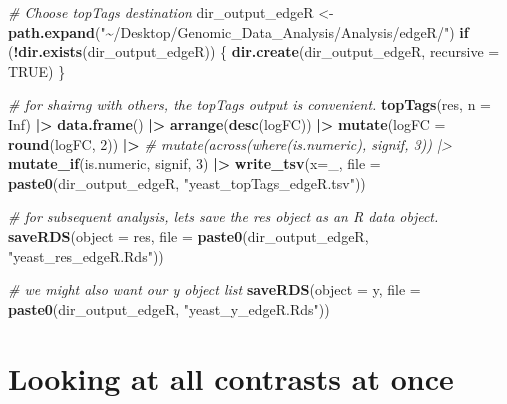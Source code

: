 \documentclass[
]{book}
\newenvironment{Shaded}{\begin{snugshade}}{\end{snugshade}}
\newcommand{\AttributeTok}[1]{\textcolor[rgb]{0.13,0.29,0.53}{#1}}
\newcommand{\CommentTok}[1]{\textcolor[rgb]{0.56,0.35,0.01}{\textit{#1}}}
\newcommand{\ConstantTok}[1]{\textcolor[rgb]{0.56,0.35,0.01}{#1}}
\newcommand{\ControlFlowTok}[1]{\textcolor[rgb]{0.13,0.29,0.53}{\textbf{#1}}}
\newcommand{\DecValTok}[1]{\textcolor[rgb]{0.00,0.00,0.81}{#1}}
\newcommand{\FunctionTok}[1]{\textcolor[rgb]{0.13,0.29,0.53}{\textbf{#1}}}
\newcommand{\NormalTok}[1]{#1}
\newcommand{\OtherTok}[1]{\textcolor[rgb]{0.56,0.35,0.01}{#1}}
\newcommand{\SpecialCharTok}[1]{\textcolor[rgb]{0.81,0.36,0.00}{\textbf{#1}}}
\newcommand{\StringTok}[1]{\textcolor[rgb]{0.31,0.60,0.02}{#1}}
\begin{document}
\begin{Shaded}
\begin{Highlighting}[]
\CommentTok{\# Choose topTags destination}
\NormalTok{dir\_output\_edgeR }\OtherTok{\textless{}{-}}
  \FunctionTok{path.expand}\NormalTok{(}\StringTok{"\textasciitilde{}/Desktop/Genomic\_Data\_Analysis/Analysis/edgeR/"}\NormalTok{)}
\ControlFlowTok{if}\NormalTok{ (}\SpecialCharTok{!}\FunctionTok{dir.exists}\NormalTok{(dir\_output\_edgeR)) \{}
  \FunctionTok{dir.create}\NormalTok{(dir\_output\_edgeR, }\AttributeTok{recursive =} \ConstantTok{TRUE}\NormalTok{)}
\NormalTok{\}}

\CommentTok{\# for shairng with others, the topTags output is convenient.}
\FunctionTok{topTags}\NormalTok{(res, }\AttributeTok{n =} \ConstantTok{Inf}\NormalTok{) }\SpecialCharTok{|\textgreater{}} \FunctionTok{data.frame}\NormalTok{() }\SpecialCharTok{|\textgreater{}}
  \FunctionTok{arrange}\NormalTok{(}\FunctionTok{desc}\NormalTok{(logFC)) }\SpecialCharTok{|\textgreater{}}
  \FunctionTok{mutate}\NormalTok{(}\AttributeTok{logFC =} \FunctionTok{round}\NormalTok{(logFC, }\DecValTok{2}\NormalTok{)) }\SpecialCharTok{|\textgreater{}}
  \CommentTok{\# mutate(across(where(is.numeric), signif, 3)) |\textgreater{}}
  \FunctionTok{mutate\_if}\NormalTok{(is.numeric, signif, }\DecValTok{3}\NormalTok{) }\SpecialCharTok{|\textgreater{}}
  \FunctionTok{write\_tsv}\NormalTok{(}\AttributeTok{x=}\NormalTok{\_, }\AttributeTok{file =} \FunctionTok{paste0}\NormalTok{(dir\_output\_edgeR, }\StringTok{"yeast\_topTags\_edgeR.tsv"}\NormalTok{))}

\CommentTok{\# for subsequent analysis, let\textquotesingle{}s save the res object as an R data object.}
\FunctionTok{saveRDS}\NormalTok{(}\AttributeTok{object =}\NormalTok{ res, }\AttributeTok{file =} \FunctionTok{paste0}\NormalTok{(dir\_output\_edgeR, }\StringTok{"yeast\_res\_edgeR.Rds"}\NormalTok{))}

\CommentTok{\# we might also want our y object list}
\FunctionTok{saveRDS}\NormalTok{(}\AttributeTok{object =}\NormalTok{ y, }\AttributeTok{file =} \FunctionTok{paste0}\NormalTok{(dir\_output\_edgeR, }\StringTok{"yeast\_y\_edgeR.Rds"}\NormalTok{))}
\end{Highlighting}
\end{Shaded}

\hypertarget{looking-at-all-contrasts-at-once}{%
\section{Looking at all contrasts at once}\label{looking-at-all-contrasts-at-once}}
\end{document}

